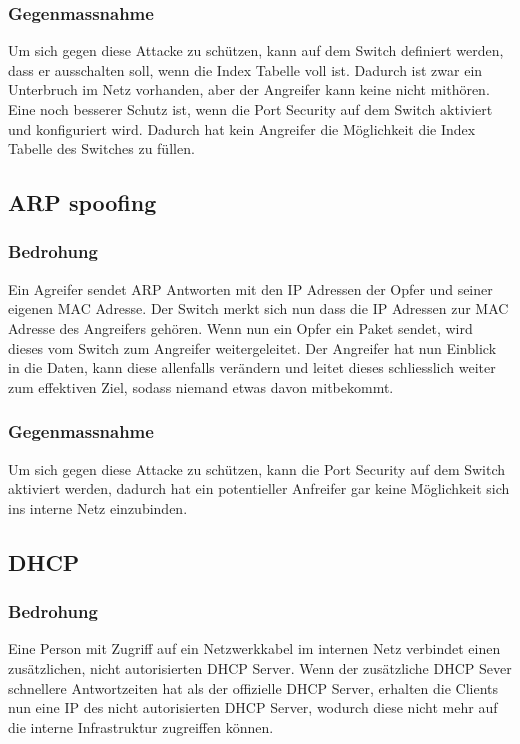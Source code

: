 \documentclass[11pt,a4paper,parskip=half]{scrartcl}
\begin{document}
\subsubsection{Gegenmassnahme}
Um sich gegen diese Attacke zu schützen, kann auf dem Switch definiert werden, dass er ausschalten soll, wenn die Index Tabelle voll ist. Dadurch ist zwar ein Unterbruch im Netz vorhanden, aber der Angreifer kann keine nicht mithören.\\
Eine noch besserer Schutz ist, wenn die Port Security auf dem Switch aktiviert und konfiguriert wird. Dadurch hat kein Angreifer die Möglichkeit die Index Tabelle des Switches zu füllen.

\subsection{ARP spoofing}
\subsubsection{Bedrohung}
Ein Agreifer sendet ARP Antworten mit den IP Adressen der Opfer und seiner eigenen MAC Adresse. Der Switch merkt sich nun dass die IP Adressen zur MAC Adresse des Angreifers gehören. Wenn nun ein Opfer ein Paket sendet, wird dieses vom Switch zum Angreifer weitergeleitet. Der Angreifer hat nun Einblick in die Daten, kann diese allenfalls verändern und leitet dieses schliesslich weiter zum effektiven Ziel, sodass niemand etwas davon mitbekommt.
\subsubsection{Gegenmassnahme}
Um sich gegen diese Attacke zu schützen, kann die Port Security auf dem Switch aktiviert werden, dadurch hat ein potentieller Anfreifer gar keine Möglichkeit sich ins interne Netz einzubinden.

\subsection{DHCP}
\subsubsection{Bedrohung}
Eine Person mit Zugriff auf ein Netzwerkkabel im internen Netz verbindet einen zusätzlichen, nicht autorisierten DHCP Server. Wenn der zusätzliche DHCP Sever schnellere Antwortzeiten hat als der offizielle DHCP Server, erhalten die Clients nun eine IP des nicht autorisierten DHCP Server, wodurch diese nicht mehr auf die interne Infrastruktur zugreiffen können.
\end{document}
